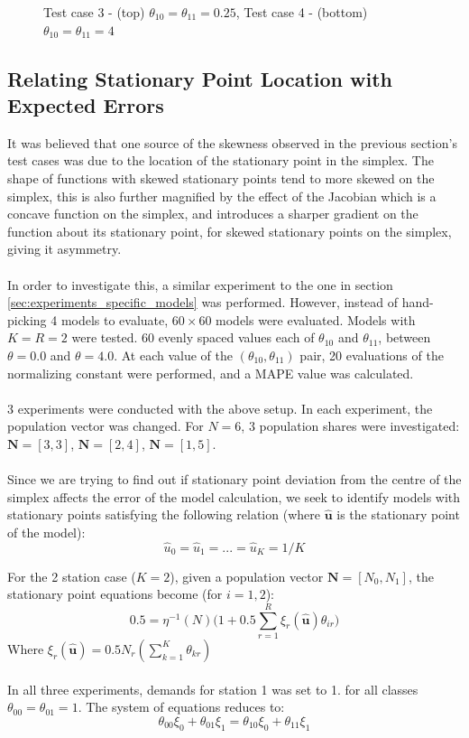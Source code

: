 \begin{figure}[!htb]
\begin{center}
\begin{subfigure}
\end{subfigure}
\caption{Test case 3 - (top) \(\theta_{10}=\theta_{11}=0.25\), Test case 4 - (bottom) \(\theta_{10}=\theta_{11}=4\)}
\label{fig:spec_model_D_1_1_4_4_N_3_3}
\end{center}
\end{figure}

\subsection{Relating Stationary Point Location with Expected Errors}

It was believed that one source of the skewness observed in the previous section's test cases was due to the location of the stationary point in the simplex. The shape of functions with skewed stationary points tend to more skewed on the simplex, this is also further magnified by the effect of the Jacobian which is a concave function on the simplex, and introduces a sharper gradient on the function about its stationary point, for skewed stationary points on the simplex, giving it asymmetry.
\\\\
In order to investigate this, a similar experiment to the one in section \ref{sec:experiments_specific_models} was performed. However, instead of hand-picking 4 models to evaluate, \(60 \times 60\) models were evaluated. Models with \(K=R=2\) were tested. \(60\) evenly spaced values each of \(\theta_{10}\) and \(\theta_{11}\), between \(\theta=0.0\) and \(\theta=4.0\). At each value of the \((\theta_{10}, \theta_{11})\) pair, 20 evaluations of the normalizing constant were performed, and a MAPE value was calculated.
\\\\
3 experiments were conducted with the above setup. In each experiment, the population vector was changed. For \(N=6\), 3 population shares were investigated: \(\mathbf{N} = [3,3]\), \(\mathbf{N} = [2,4]\), \(\mathbf{N} = [1,5]\). 
\\\\
Since we are trying to find out if stationary point deviation from the centre of the simplex affects the error of the model calculation, we seek to identify models with stationary points satisfying the following relation (where \(\mathbf{\hat{u}}\) is the stationary point of the model):
\[\hat{u}_0 = \hat{u}_1 = ... = \hat{u}_K = 1/K\]

For the 2 station case (\(K=2\)), given a population vector \(\mathbf{N} = [N_0, N_1]\), the stationary point equations become (for \(i = 1,2\)):
\[0.5 = \eta^{-1}(N) \bigg( 1 + 0.5 \sum_{r=1}^R \xi_r(\mathbf{\hat{u}}) \theta_{ir} \bigg)\]
Where \( \xi_r(\mathbf{\hat{u}}) = 0.5 N_r (\sum_{k=1}^K \theta_{kr})\)
\\\\
In all three experiments, demands for station 1 was set to 1. for all classes \(\theta_{00} = \theta_{01} = 1.\) The system of equations reduces to:
\[ \theta_{00} \xi_0 + \theta_{01} \xi_1 = \theta_{10} \xi_0 + \theta_{11} \xi_1\]

